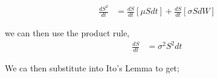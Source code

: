 \documentclass[12pt]{article}
\begin{document}
	\begin{align*}
	\frac{dS^2}{dt} &= \frac{dS}{dt}[\mu Sdt] + \frac{dS}{dt}[\sigma SdW]
	\end{align*}
	
	we can then use the product rule,
	\begin{align*}
	\frac{dS}{dt} &= \sigma ^2 S^2 dt 
	\end{align*}
	
	We ca then substitute into Ito's Lemma to get;
	
	
	
	
	
	
	
	
	
	
	
	
	
	
	
	
	
\end{document}

